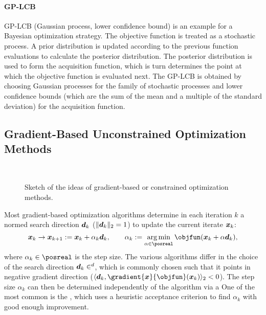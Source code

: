\paragraph{GP-LCB}

GP-LCB (Gaussian process, lower confidence bound)
 is an example
for a Bayesian optimization strategy.
The objective function is treated as a stochastic process.
A prior distribution is updated according to the previous function
evaluations to calculate the posterior distribution.
The posterior distribution is used to form the acquisition function,
which is turn determines the point at which the objective
function is evaluated next.
The GP-LCB is obtained by choosing
Gaussian processes for the family of stochastic processes and
lower confidence bounds (which are the sum of the mean
and a multiple of the standard deviation) for the acquisition function.



\subsection{Gradient-Based Unconstrained Optimization Methods}
\label{sec:512gradientBasedUnconstrained}

\begin{figure}
  \qquad{}\qquad{}%
  \\[3mm]%
  \quad{}\quad{}%
  \caption[Ideas of various gradient-based optimization methods]{%
    Sketch of the ideas of gradient-based or constrained
    optimization methods.%
  }%
  \label{fig:optimizationMethodGradientBased}%
\end{figure}

Most gradient-based optimization algorithms determine in
each iteration $k$ a normed search direction ${\boldsymbol{d}}_k$
($\norm[2]{\*d_k} = 1$) to update the current iterate ${\boldsymbol{x}}_k$:
\begin{equation}
  \*x_k
  \to \*x_{k+1}
  := \*x_k + \alpha_k \*d_k,\qquad
  \alpha_k
  := \argmin_{\alpha \in \posreal} \objfun(\*x_k + \alpha \*d_k),
\end{equation}
where $\alpha_k \in \posreal$ is the step size.
The various algorithms differ in the choice of the search direction
$\*d_k \in \real^d$,
which is commonly chosen such that it points in negative gradient
direction ($\innerprod[2]{\*d_k}{\gradient{\*x}{\objfun}(\*x_k)} < 0$).
The step size $\alpha_k$ can then be determined independently of the
algorithm via a 
One of the most common is the 
,
which uses a heuristic acceptance criterion
to find $\alpha_k$ with good enough improvement.

